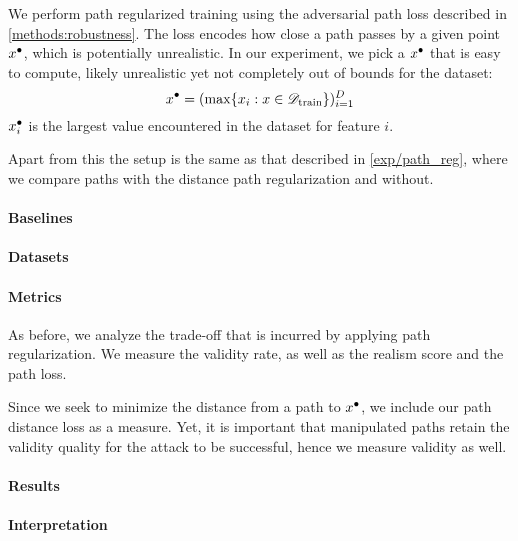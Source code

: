\documentclass[../main.tex]{subfiles}
\begin{document}
We perform path regularized training using the adversarial path loss described in \autoref{methods:robustness}.
The loss encodes how close a path passes by a given point $x^\bullet$, which is potentially unrealistic.
In our experiment, we pick a $x^\bullet$ that is easy to compute, likely unrealistic yet not completely out of bounds for the dataset:
\begin{equation}
    x^\bullet = (\max\{ x_i : x \in \mathscr{D}_\text{train} \})_{i=1}^D
\end{equation}
\ie{} $x^\bullet_i$ is the largest value encountered in the dataset for feature $i$.

Apart from this the setup is the same as that described in \autoref{exp/path_reg}, where we compare paths with the distance path regularization and without.

\paragraph{Baselines}

\paragraph{Datasets}

\paragraph{Metrics}

As before, we analyze the trade-off that is incurred by applying path regularization.
We measure the validity rate, as well as the realism score and the path loss.

Since we seek to minimize the distance from a path to $x^\bullet$, we  include our path distance loss as a measure.
Yet, it is important that manipulated paths retain the validity quality for the attack to be successful, hence we measure validity as well.

\paragraph{Results}

\paragraph{Interpretation}
\end{document}
